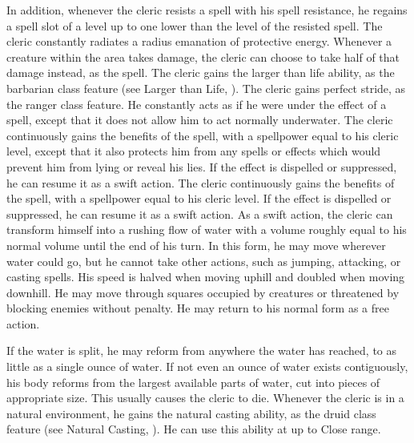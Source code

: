 In addition, whenever the cleric resists a spell with his spell resistance, he regains a spell slot of a level up to one lower than the level of the resisted spell.
The cleric constantly radiates a \areamed radius emanation of protective energy.
Whenever a creature within the area takes damage, the cleric can choose to take half of that damage instead, as the  spell.
The cleric gains the larger than life ability, as the barbarian class feature (see Larger than Life, ).
The cleric gains perfect stride, as the ranger class feature.
He constantly acts as if he were under the effect of a  spell, except that it does not allow him to act normally underwater.
 The cleric continuously gains the benefits of the 
spell, with a spellpower equal to his cleric level, except that it also protects him from any spells or effects which would prevent him from lying or reveal his lies.
If the effect is dispelled or suppressed, he can resume it as a swift action.
 The cleric continuously gains the benefits of the 
spell, with a spellpower equal to his cleric level.
If the effect is dispelled or suppressed, he can resume it as a swift action.
As a swift action, the cleric can transform himself into a rushing flow of water with a volume roughly equal to his normal volume until the end of his turn.
In this form, he may move wherever water could go, but he cannot take other actions, such as jumping, attacking, or casting spells.
His speed is halved when moving uphill and doubled when moving downhill.
He may move through squares occupied by creatures or threatened by blocking enemies without penalty.
He may return to his normal form as a free action.
\par If the water is split, he may reform from anywhere the water has reached, to as little as a single ounce of water.
If not even an ounce of water exists contiguously, his body reforms from the largest available parts of water, cut into pieces of appropriate size.
This usually causes the cleric to die.
Whenever the cleric is in a natural environment, he gains the natural casting ability, as the druid class feature (see Natural Casting, ).
He can use this ability at up to Close range.

